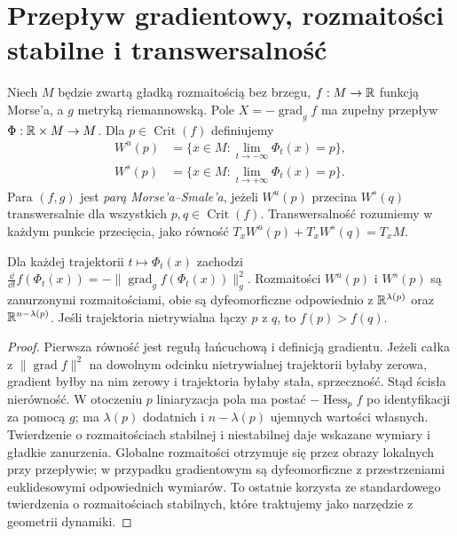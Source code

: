 \section{Przepływ gradientowy, rozmaitości stabilne i transwersalność}
\begin{definicja}
Niech $M$ będzie zwartą gładką rozmaitością bez brzegu,
$f:M\to\mathbb{R}$ funkcją Morse'a, a $g$ metryką riemannowską.
Pole $X=-\operatorname{grad}_g f$ ma zupełny przepływ
$\Phi:\mathbb{R}\times M\to M$. Dla $p\in\operatorname{Crit}(f)$ definiujemy
\begin{align*}
 W^u(p)&=\{x\in M:\lim_{t\to-\infty}\Phi_t(x)=p\},\\
 W^s(p)&=\{x\in M:\lim_{t\to+\infty}\Phi_t(x)=p\}.
\end{align*}
Para $(f,g)$ jest \emph{parą Morse'a--Smale'a}, jeżeli
$W^u(p)$ przecina $W^s(q)$ transwersalnie dla wszystkich
$p,q\in\operatorname{Crit}(f)$. Transwersalność rozumiemy w każdym
punkcie przecięcia, jako równość $T_xW^u(p)+T_xW^s(q)=T_xM$.
\end{definicja}

\begin{lemat}
\label{lem:morse-energy-v10}
Dla każdej trajektorii $t\mapsto\Phi_t(x)$ zachodzi
$\frac{\dd}{\dd t}f(\Phi_t(x))=-\|\operatorname{grad}_g f(\Phi_t(x))\|_g^2$.
Rozmaitości $W^u(p)$ i $W^s(p)$ są zanurzonymi rozmaitościami,
obie są dyfeomorficzne odpowiednio z $\mathbb{R}^{\lambda(p)}$ oraz
$\mathbb{R}^{n-\lambda(p)}$. Jeśli trajektoria nietrywialna łączy
$p$ z $q$, to $f(p)>f(q)$.
\end{lemat}
\begin{proof}
Pierwsza równość jest regułą łańcuchową i definicją gradientu.
Jeżeli całka z $\|\operatorname{grad}f\|^2$ na dowolnym odcinku
nietrywialnej trajektorii byłaby zerowa, gradient byłby na nim zerowy
i trajektoria byłaby stała, sprzeczność. Stąd ścisła nierówność.
W otoczeniu $p$ liniaryzacja pola ma postać
$-\operatorname{Hess}_pf$ po identyfikacji za pomocą $g$; ma
$\lambda(p)$ dodatnich i $n-\lambda(p)$ ujemnych wartości własnych.
Twierdzenie o rozmaitościach stabilnej i niestabilnej daje wskazane
wymiary i gładkie zanurzenia. Globalne rozmaitości otrzymuje się
przez obrazy lokalnych przy przepływie; w przypadku gradientowym
są dyfeomorficzne z przestrzeniami euklidesowymi odpowiednich wymiarów.
To ostatnie korzysta ze standardowego twierdzenia o rozmaitościach
stabilnych, które traktujemy jako narzędzie z geometrii dynamiki.
\end{proof}

